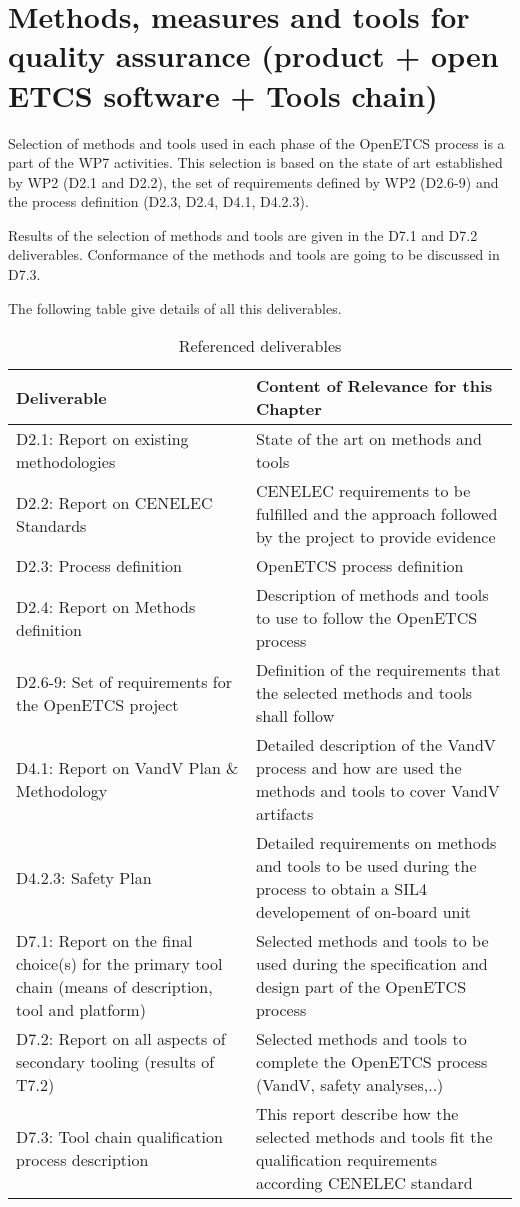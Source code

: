 \documentclass{template/openetcs_article}
\begin{document}
\section{Methods, measures and tools for quality assurance (product + open \gls{ETCS} software + Tools chain)}


Selection of methods and tools used in each phase of the OpenETCS process is a part of the WP7 activities. This selection is based on the state of art established by WP2 (D2.1 and D2.2), the set of requirements defined by WP2 (D2.6-9) and the process definition (D2.3, D2.4, D4.1, D4.2.3).

Results of the selection of methods and tools are given in the D7.1 and D7.2 deliverables. Conformance of the methods and tools are going to be discussed in D7.3.

The following table give details of all this deliverables.

\begin{table}[H]
\begin{supertabular}{|m{3cm}|m{11cm}|}
\hline
{}
Deliverable &
Content of Relevance for this Chapter\\\hline
D2.1: Report on existing methodologies &
State of the art on methods and tools \\\hline
D2.2: Report on CENELEC Standards &
CENELEC requirements to be fulfilled and the approach followed by the project to provide evidence\\\hline
D2.3: Process definition &
OpenETCS process definition \\\hline
D2.4: Report on Methods definition &
Description of methods and tools to use to follow the OpenETCS process \\\hline
D2.6-9: Set of requirements for the OpenETCS project &
Definition of the requirements that the selected methods and tools shall follow \\\hline
D4.1: Report on \gls{VandV} Plan \& Methodology &
Detailed description of the \gls{VandV} process and how are used the methods and tools to cover \gls{VandV} artifacts \\\hline
D4.2.3: Safety Plan &
Detailed requirements on methods and tools to be used during the process to obtain a \gls{SIL}4 developement of \gls{on-board unit} \\\hline
D7.1: Report on the final choice(s) for the primary tool chain (means of description, tool and platform) &
Selected methods and tools to be used during the specification and design part of the OpenETCS process \\\hline
D7.2: Report on all aspects of secondary tooling (results of T7.2)  &
Selected methods and tools to complete the OpenETCS process (\gls{VandV}, safety analyses,..) \\\hline
D7.3: Tool chain qualification process description &
This report describe how the selected methods and tools fit the qualification requirements according CENELEC standard \\\hline
\end{supertabular}
\caption{Referenced deliverables}
\end{table}
\end{document}
